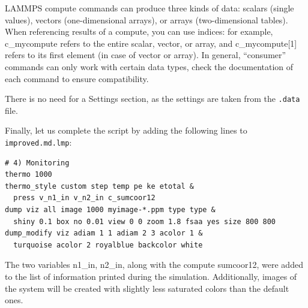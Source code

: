 \documentclass[9pt,tutorial]{livecoms}
\newcommand{\lmpcmd}[1]{\hspace{0pt}\colorbox{listing}{\textcolor{command}{\small{#1}}}\hspace{0pt}} %
\newcommand{\flecmd}[1]{\textcolor{command}{\texttt{#1}}} %
\begin{document}
\begin{note}
{\color{blue}
LAMMPS \lmpcmd{compute} commands can produce three kinds of data: scalars (single values), 
vectors (one-dimensional arrays), or arrays (two-dimensional tables).  
When referencing results of a compute, you can use indices: for example, 
\lmpcmd{c\_mycompute} refers to the entire scalar, vector, or array, and
\lmpcmd{c\_mycompute[1]} refers to its first element (in case of vector or array).  
In general, ``consumer'' commands can only work with certain data types,
check the documentation of each command to ensure compatibility.
}
\end{note}

\begin{note}
There is no need for a \lmpcmd{Settings}
section, as the settings are taken from the \flecmd{.data} file.
\end{note}

Finally, let us complete the script by adding the following lines to
\flecmd{improved.md.lmp}:
\begin{lstlisting}
# 4) Monitoring
thermo 1000
thermo_style custom step temp pe ke etotal &
  press v_n1_in v_n2_in c_sumcoor12
dump viz all image 1000 myimage-*.ppm type type &
  shiny 0.1 box no 0.01 view 0 0 zoom 1.8 fsaa yes size 800 800
dump_modify viz adiam 1 1 adiam 2 3 acolor 1 &
  turquoise acolor 2 royalblue backcolor white
\end{lstlisting}
The two variables \lmpcmd{n1\_in}, \lmpcmd{n2\_in}, along with the compute
\lmpcmd{sumcoor12}, were added to the list of information printed during
the simulation.  Additionally, images of the system will be created with
slightly less saturated colors than the default ones.
\end{document}
